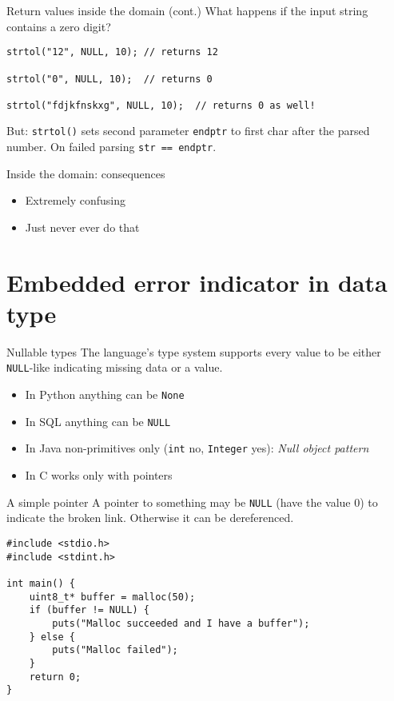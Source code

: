 \documentclass[aspectratio=169,14pt]{beamer}
\begin{document}
\begin{frame}[fragile]{Return values inside the domain (cont.)}
What happens if the input string contains a zero digit?

\begin{lstlisting}[style=cstyle]
strtol("12", NULL, 10); // returns 12

strtol("0", NULL, 10);  // returns 0

strtol("fdjkfnskxg", NULL, 10);  // returns 0 as well!
\end{lstlisting}

But: \texttt{strtol()} sets second parameter \texttt{endptr} to first char after the parsed number. On failed parsing \texttt{str == endptr}.
\end{frame}




\begin{frame}[fragile]{Inside the domain: consequences}
\begin{itemize}
    \item[\bad] Extremely confusing
    \item[\bad] Just never ever do that
\end{itemize}
\end{frame}




\section{Embedded error indicator in data type}

\begin{frame}{Nullable types}
The language's type system supports every value to be either \texttt{NULL}-like indicating missing data or a value.

\begin{itemize}
    \item In Python anything can be \texttt{None}
    \item In SQL anything can be \texttt{NULL}
    \item In Java non-primitives only (\texttt{int} no, \texttt{Integer} yes): \textit{Null object pattern}
    \item In C works only with pointers
\end{itemize}
\end{frame}



\begin{frame}[fragile]{A simple pointer}
A pointer to something may be \texttt{NULL} (have the value 0) to indicate the broken link. Otherwise it can be dereferenced.

\begin{lstlisting}[style=cstyle]
#include <stdio.h>
#include <stdint.h>

int main() {
    uint8_t* buffer = malloc(50);
    if (buffer != NULL) {
        puts("Malloc succeeded and I have a buffer");
    } else {
        puts("Malloc failed");
    }
    return 0;
}
\end{lstlisting}
\end{frame}
\end{document}
